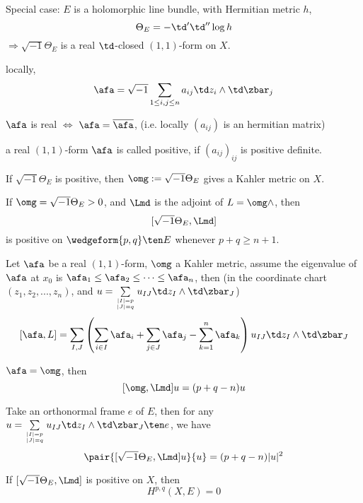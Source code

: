 Special case: $E$ is a holomorphic line bundle, with Hermitian metric $h$,
$$\Theta_E=-\td'\td''\log h$$
$\Rightarrow\sqrt{-1}\Theta_E$ is a real $\td$-closed $(1,1)$-form on $X$.

locally,
$$
     \afa=
\sqrt{-1}\sum_{1\leq i,j\leq n}
  a_{ij}\td z_i\wedge\td\zbar_j
$$

$\afa$ is real $\iff$ $\afa=\overline{\afa}$,
(i.e. locally $(a_{ij})$ is an hermitian matrix)

\begin{definition}
a real $(1,1)$-form $\afa$ is called positive, if
$(a_{ij})_{ij}$ is positive definite.
\end{definition}

\begin{lemma}
If $\sqrt{-1}\Theta_E$ is positive, then $\omg:=\sqrt{-1}\Theta_E$ gives a
Kahler metric on $X$.
\end{lemma}

\begin{lemma}
If $\omg=\sqrt{-1}\Theta_E>0$, and $\Lmd$ is the adjoint of $L=\omg\wedge$,
then
$$[\sqrt{-1}\Theta_E,\Lmd]$$
is positive on $\wedgeform{p,q}\ten E$
whenever $p+q\geq n+1$.
\end{lemma}

\begin{lemma}
Let $\afa$ be a real $(1,1)$-form, $\omg$ a Kahler metric, assume
the eigenvalue of $\afa$ at $x_0$ is $\afa_1\leq\afa_2\leq\cdots\leq\afa_n$,
then (in the coordinate chart $(z_1,z_2,...,z_n)$, and
$u=\sum\limits_{|I|=p\atop|J|=q}u_{IJ}\td z_I\wedge\td\zbar_J$)
$$
  [\afa,L]
=
  \sum_{I,J}
    \left(
      \sum_{i\in I}\afa_i
    + \sum_{j\in J}\afa_j
    - \sum_{k=1}^n\afa_k
    \right)
    u_{IJ}\td z_I\wedge\td\zbar_J
$$
\end{lemma}

\begin{cor}
$
  \afa=\omg
$, then
$$[\omg,\Lmd]u=(p+q-n)u$$
\end{cor}

\begin{cor}
Take an orthonormal frame $e$ of $E$, then
for any $u=\sum \limits_{|I|=p\atop|J|=q}u_{IJ}\td z_I\wedge\td\zbar_J\ten e$, we have
$$
  \pair{
  [\sqrt{-1}\Theta_E,\Lmd
  ]u
  }{u}
=(p+q-n)|u|^2
$$
\end{cor}

\begin{thm}
If $[\sqrt{-1}\Theta_E,\Lmd]$ is positive on $X$,
then
$$H^{p,q}(X,E)=0$$
\end{thm}

